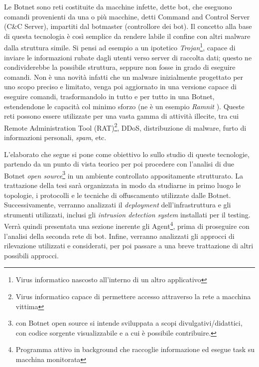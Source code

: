 Le Botnet sono reti costituite da macchine infette, dette bot, che eseguono comandi provenienti da una o più macchine, detti Command and Control Server (C\&C Server), impartiti dal botmaster (controllore dei bot). Il concetto alla base di questa tecnologia è così semplice da rendere labile il confine con altri malware dalla struttura simile. Si pensi ad esempio a un ipotetico \textit{Trojan}\footnote{Virus informatico nascosto all'interno di un altro applicativo}, capace di inviare le informazioni rubate dagli utenti verso server di raccolta dati; questo ne condividerebbe la possibile struttura, seppure non fosse in grado di eseguire comandi. Non è una novità infatti che un malware inizialmente progettato per uno scopo preciso e limitato, venga poi aggiornato in una versione capace di eseguire comandi, trasformandolo in tutto e per tutto in una Botnet, estendendone le capacità col minimo sforzo (ne è un esempio \textit{Ramnit} \cite{IBMSecBlogRamnit}). Queste reti possono essere utilizzate per una vasta gamma di attività illecite, tra cui  Remote Administration Tool (RAT)\footnote{Virus informatico capace di permettere accesso attraverso la rete a macchina vittima}, DDoS, distribuzione di malware, furto di informazioni personali, \textit{spam}, etc.

L’elaborato che segue si pone come obiettivo lo sullo studio di queste tecnologie, partendo da un punto di vista teorico per poi procedere con l'analisi di due Botnet \textit{open source}\footnote{con Botnet open source si intende sviluppata a scopi divulgativi/didattici, con codice sorgente visualizzabile e a cui è possibile contribuire.} in un ambiente controllato appositamente strutturato. La trattazione della tesi sarà organizzata in modo da studiarne in primo luogo le topologie, i protocolli e le tecniche di offuscamento utilizzate dalle Botnet. Successivamente, verranno analizzati il \textit{deployment} dell'infrastruttura e gli strumenti utilizzati, inclusi gli  \textit{intrusion detection system} installati per il testing. Verrà quindi presentata una sezione inerente gli Agent\footnote{Programma attivo in background che raccoglie informazione ed esegue task su macchina monitorata}, prima di proseguire con l’analisi della seconda rete di bot. Infine, verranno analizzati gli approcci di rilevazione utilizzati e considerati, per poi passare a una breve trattazione di altri possibili approcci.
